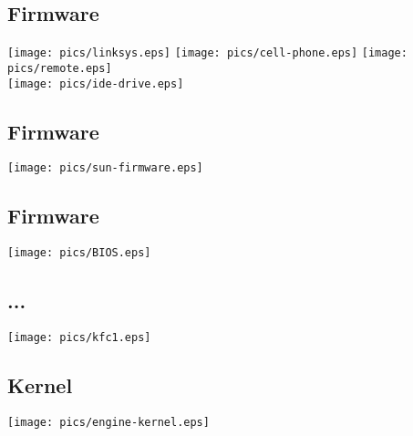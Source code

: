 \documentclass[xga]{xdvislides}
\begin{document}
\subsection{Firmware}
\begin{center}
	\texttt{[image: pics/linksys.eps]}
	\texttt{[image: pics/cell-phone.eps]}
	\texttt{[image: pics/remote.eps]} \\
	\texttt{[image: pics/ide-drive.eps]}
\end{center}



\subsection{Firmware}
\begin{center}
	\texttt{[image: pics/sun-firmware.eps]}
\end{center}

\subsection{Firmware}
\begin{center}
	\texttt{[image: pics/BIOS.eps]}
\end{center}

\subsection{...}
\begin{center}
	\texttt{[image: pics/kfc1.eps]}
\end{center}

\subsection{Kernel}
\begin{center}
        \texttt{[image: pics/engine-kernel.eps]}
\end{center}
\end{document}
